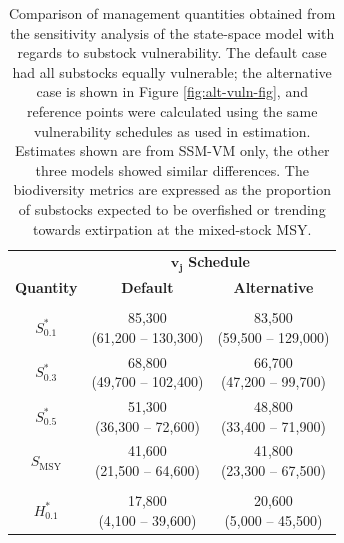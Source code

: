 \documentclass[12pt,]{book}
\theoremstyle{definition}
\theoremstyle{definition}
\theoremstyle{definition}
\theoremstyle{remark}
\begin{document}
\begin{table}

\caption{\label{tab:alt-vuln-table}Comparison of management quantities obtained from the sensitivity analysis of the state-space model with regards to substock vulnerability. The default case had all substocks equally vulnerable; the alternative case is shown in Figure \ref{fig:alt-vuln-fig}, and reference points were calculated using the same vulnerability schedules as used in estimation. Estimates shown are from SSM-VM only, the other three models showed similar differences. The biodiversity metrics are expressed as the proportion of substocks expected to be overfished or trending towards extirpation at the mixed-stock MSY.}
\centering
\begin{tabular}[t]{ccc}
\toprule
\multicolumn{1}{c}{} & \multicolumn{2}{c}{$\boldsymbol{v_j}$ \textbf{Schedule}} \\
\cmidrule(l{2pt}r{2pt}){2-3}
\textbf{Quantity} & \textbf{Default} & \textbf{Alternative}\\
\midrule
\addlinespace[0.3em]
\multicolumn{3}{l}{\textbf{Escapement}}\\
\hline
\hspace{1em}$S^*_{0.1}$ & \makecell[c]{85,300\\(61,200 -- 130,300)} & \makecell[c]{83,500\\(59,500 -- 129,000)}\\
\hspace{1em}$S^*_{0.3}$ & \makecell[c]{68,800\\(49,700 -- 102,400)} & \makecell[c]{66,700\\(47,200 -- 99,700)}\\
\hspace{1em}$S^*_{0.5}$ & \makecell[c]{51,300\\(36,300 -- 72,600)} & \makecell[c]{48,800\\(33,400 -- 71,900)}\\
\hspace{1em}$S_{\text{MSY}}$ & \makecell[c]{41,600\\(21,500 -- 64,600)} & \makecell[c]{41,800\\(23,300 -- 67,500)}\\
\addlinespace[0.3em]
\multicolumn{3}{l}{\textbf{Harvest}}\\
\hline
\hspace{1em}$H^*_{0.1}$ & \makecell[c]{17,800\\(4,100 -- 39,600)} & \makecell[c]{20,600\\(5,000 -- 45,500)}\\

\end{tabular}
\end{table}
\end{document}

